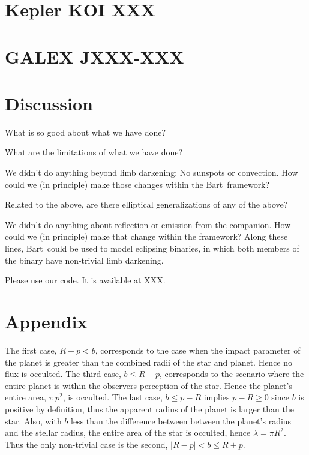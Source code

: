 \documentclass[12pt,preprint]{aastex}
\newcommand{\project}[1]{{\sffamily #1}}
\newcommand{\bart}{\project{Bart}}
\begin{document}
\section{Kepler KOI XXX}

\section{GALEX JXXX-XXX}

\section{Discussion}

What is so good about what we have done?

What are the limitations of what we have done?

We didn't do anything beyond limb darkening:  No sunspots or convection.
How could we (in principle) make those changes within the \bart\ framework?

Related to the above, are there elliptical generalizations of any of the above?

We didn't do anything about reflection or emission from the companion.
How could we (in principle) make that change within the framework?
Along these lines, \bart\ could be used to model eclipsing binaries,
in which both members of the binary have non-trivial limb darkening.

Please use our code.  It is available at XXX.

\acknowledgments

\section{Appendix}

The first case, $R+p < b$, corresponds to the case when the impact parameter of
the planet is greater than the combined radii of the star and planet. Hence no
flux is occulted.  The third case, $b \leq R-p$, corresponds to the scenario
where the entire planet is within the observers perception of the star.  Hence
the planet's entire area, $\pi \, p^2$, is occulted.  The last case, $b \leq p-R$ implies
$p-R \geq 0$ since $b$ is positive by definition, thus the apparent radius of the
planet is larger than the star.  Also, with $b$ less than the difference between
between the planet's radius and the stellar radius, the entire area
of the star is occulted, hence $\lambda = \pi R^2$.  Thus the only non-trivial
case is the second, $|R-p| < b \leq R+p$.
\end{document}
